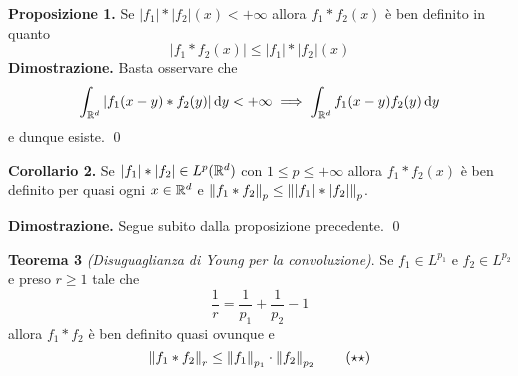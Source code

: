 \documentclass[a4paper, 12pt]{report}
\begin{document}
%
%


\textbf{Proposizione 1.}
Se $|f_1| \ast |f_2| (x) < +\infty$ allora $f_1 \ast f_2(x)$ è ben definito in quanto
$$
|f_1 \ast f_2(x)| \leq |f_1| \ast |f_2|(x)
$$
\textbf{Dimostrazione.}
Basta osservare che
$$
\int_{\mathbb R^d} |f_1(x - y) \ast f_2(y)| \,\mathrm{d} y < +\infty 
\implies \int_{\mathbb R^d} f_1(x - y) f_2(y) \,\mathrm{d} y
$$
e dunque esiste.
\qed

\textbf{Corollario 2.}
Se $|f_1| \ast |f_2| \in L^p(\mathbb R^d)$ con $1 \leq p \leq +\infty$ allora $f_1 \ast f_2(x)$ è ben definito per quasi ogni $x \in \mathbb R^d$ e $\left\lVert f_1 \ast f_2 \right\rVert_p \leq \left\lVert |f_1| \ast |f_2| \right\rVert_p$.

\textbf{Dimostrazione.}
Segue subito dalla proposizione precedente.
\qed

\textbf{Teorema 3} \textit{(Disuguaglianza di Young per la convoluzione)}.
Se $f_1 \in L^{p_1}$ e $f_2 \in L^{p_2}$ e preso $r \geq 1$ tale che
\begin{equation}\label{eqn:conv_th3_cond}
	\frac{1}{r} = \frac{1}{p_1} + \frac{1}{p_2} - 1
	\tag{$\star$}
\end{equation}
allora $f_1 \ast f_2$ è ben definito quasi ovunque e
\begin{equation}\label{eqn:conv_th3_thesis}
	\left\lVert f_1 \ast f_2 \right\rVert_r \leq \left\lVert f_1 \right\rVert_{p_1} \cdot \left\lVert f_2 \right\rVert_{p_2}
	\tag{$\star\star$}
\end{equation}
\end{document}
